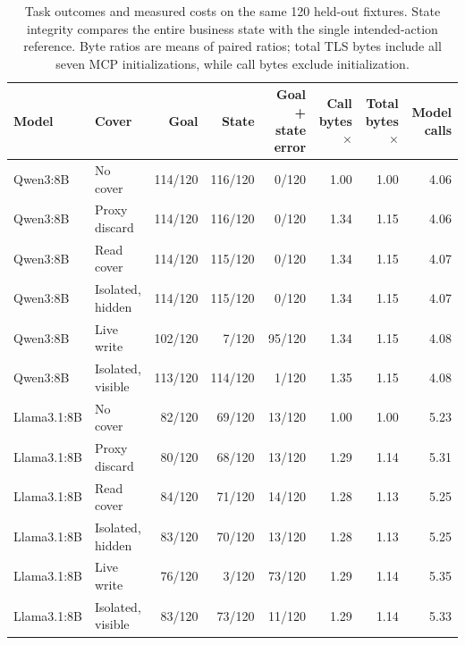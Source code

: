 \begin{table}[t]
\centering\small
\setlength{\tabcolsep}{4pt}
\caption{Task outcomes and measured costs on the same 120 held-out fixtures. State integrity compares the entire business state with the single intended-action reference. Byte ratios are means of paired ratios; total TLS bytes include all seven MCP initializations, while call bytes exclude initialization.}
\label{tab:m3-llm-utility}
\begin{tabular}{llrrrrrr}
\toprule
Model & Cover & Goal & State & Goal + state error & Call bytes $\times$ & Total bytes $\times$ & Model calls \\
\midrule
Qwen3:8B & No cover & 114/120 & 116/120 & 0/120 & 1.00 & 1.00 & 4.06 \\
Qwen3:8B & Proxy discard & 114/120 & 116/120 & 0/120 & 1.34 & 1.15 & 4.06 \\
Qwen3:8B & Read cover & 114/120 & 115/120 & 0/120 & 1.34 & 1.15 & 4.07 \\
Qwen3:8B & Isolated, hidden & 114/120 & 115/120 & 0/120 & 1.34 & 1.15 & 4.07 \\
Qwen3:8B & Live write & 102/120 & 7/120 & 95/120 & 1.34 & 1.15 & 4.08 \\
Qwen3:8B & Isolated, visible & 113/120 & 114/120 & 1/120 & 1.35 & 1.15 & 4.08 \\
Llama3.1:8B & No cover & 82/120 & 69/120 & 13/120 & 1.00 & 1.00 & 5.23 \\
Llama3.1:8B & Proxy discard & 80/120 & 68/120 & 13/120 & 1.29 & 1.14 & 5.31 \\
Llama3.1:8B & Read cover & 84/120 & 71/120 & 14/120 & 1.28 & 1.13 & 5.25 \\
Llama3.1:8B & Isolated, hidden & 83/120 & 70/120 & 13/120 & 1.28 & 1.13 & 5.25 \\
Llama3.1:8B & Live write & 76/120 & 3/120 & 73/120 & 1.29 & 1.14 & 5.35 \\
Llama3.1:8B & Isolated, visible & 83/120 & 73/120 & 11/120 & 1.29 & 1.14 & 5.33 \\
\bottomrule
\end{tabular}
\end{table}
